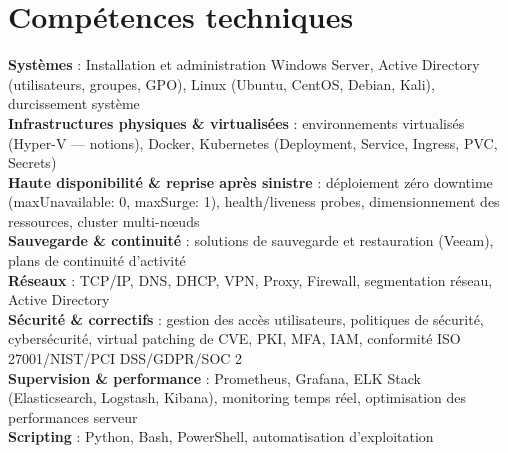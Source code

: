 \documentclass[a4paper,9pt]{article}
\begin{document}
\section{Compétences techniques}
\textbf{Systèmes} : Installation et administration Windows Server, Active Directory (utilisateurs, groupes, GPO), Linux (Ubuntu, CentOS, Debian, Kali), durcissement système\\[0.3pt]
\textbf{Infrastructures physiques \& virtualisées} : environnements virtualisés (Hyper-V --- notions), Docker, Kubernetes (Deployment, Service, Ingress, PVC, Secrets)\\[0.3pt]
\textbf{Haute disponibilité \& reprise après sinistre} : déploiement zéro downtime (maxUnavailable: 0, maxSurge: 1), health/liveness probes, dimensionnement des ressources, cluster multi-nœuds\\[0.3pt]
\textbf{Sauvegarde \& continuité} : solutions de sauvegarde et restauration (Veeam), plans de continuité d'activité\\[0.3pt]
\textbf{Réseaux} : TCP/IP, DNS, DHCP, VPN, Proxy, Firewall, segmentation réseau, Active Directory\\[0.3pt]
\textbf{Sécurité \& correctifs} : gestion des accès utilisateurs, politiques de sécurité, cybersécurité, virtual patching de CVE, PKI, MFA, IAM, conformité ISO 27001/NIST/PCI DSS/GDPR/SOC 2\\[0.3pt]
\textbf{Supervision \& performance} : Prometheus, Grafana, ELK Stack (Elasticsearch, Logstash, Kibana), monitoring temps réel, optimisation des performances serveur\\[0.3pt]
\textbf{Scripting} : Python, Bash, PowerShell, automatisation d'exploitation
\end{document}
